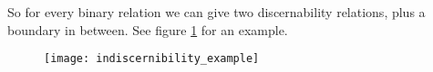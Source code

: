 \documentclass[11pt,a4paper,notitlepage,onecolumn,twoside]{article}
\newtheorem{definition}{Definition}
\begin{document}
So for every binary relation we can give two discernability relations, plus a boundary in between. See figure \ref{fig:indiscernibility_example} for an example.

\begin{figure}
\label{fig:indiscernibility_example}
\texttt{[image: indiscernibility\_example]}
\end{figure}





\begin{comment}
\section{Approach II}

How to handle:
\begin{itemize}
\item \textbf{Properties of arbitrary depth.} Properties can have arbitrary
      depth. For instance I am living in a city that is located in a country
      that is part of the European Union. Deep properties traverse
      (non-linked) resources or blank nodes.
\item \textbf{Property hierarchy} Should subproperties be treated
      as separate properties, not at all, or in a special way?
\item \textbf{Graphyness} An RDF graph is assumed to be a `real' graph,
      i.e., RDF properties cannot be RDF nodes.
\end{itemize}

We are given an equivalence relation $\approx$ which is induced from the given set of triples. The properties that are used to construct the quivalence relation can be freely chosen, although obvious choices involve \emph{owl:sameAs}, \emph{skos:somewhatKindaSimila}.

The universe of discourse $\mathbb{U}$ consists of the RDF nodes that appear
in the given triples.

We define a mapping from partition members onto $\mathcal{P}(\mathbb{P})$,
where $\mathbb{P}$ are the properties that occur in the given set of triples.
\footnote{Here we assume that no property is an RDF node.}

\begin{definition}[Predicates]
\begin{eqnarray}
f^{+}_{\mathbb{P}}([x]_{\approx}) = \{ P &\vert&
    \exists y_1 \in [x]_{\approx}, \exists z_1 (y_1Pz_1 \land \\
    & & \  \forall y_2 \in [x]_{\approx} \setminus \{ y_1 \},
    \exists z_2 (y_2Pz_2 \rightarrow z_1 = z_2))) \} \nonumber
\end{eqnarray}
\end{definition}


\end{comment}
\end{document}
